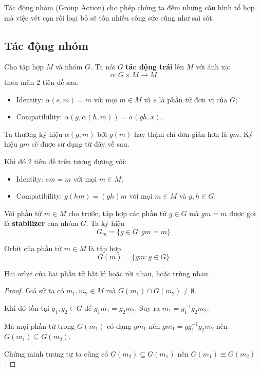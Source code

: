 Tác động nhóm (Group Action) cho phép chúng ta đếm những cấu hình tổ hợp mà việc vét cạn rồi loại bỏ sẽ tốn nhiều công sức cũng như sai sót.

\subsection*{Tác động nhóm}

Cho tập hợp $M$ và nhóm $G$. Ta nói $G$ \textbf{tác động trái} lên $M$ với ánh xạ:
\[\alpha: G \times M \rightarrow M\]
thỏa mãn 2 tiên đề sau:

\begin{itemize}
    \item Identity: $\alpha (e, m) = m$ với mọi $m \in M$ và $e$ là phần tử đơn vị của $G$;
    \item Compatibility: $\alpha (g, \alpha (h, m)) = \alpha (g h, x)$.
\end{itemize}

Ta thường ký hiệu $\alpha (g, m)$ bởi $g(m)$ hay thậm chí đơn giản hơn là $gm$. Ký hiệu $gm$ sẽ được sử dụng từ đây về sau.

Khi đó 2 tiên đề trên tương đương với:

\begin{itemize}
    \item Identity: $e m = m$ với mọi $m \in M$;
    \item Compatibility: $g(hm) = (gh)m$ với mọi $m \in M$ và $g, h \in G$.
\end{itemize}

\begin{definition}
    Với phần tử $m \in M$ cho trước, tập hợp các phần tử $g \in G$ mà $gm = m$ được gọi là \textbf{stabilizer} của nhóm $G$. Ta ký hiệu
    \[G_m = \{ g \in G : gm = m \}\]
\end{definition}

\begin{definition}
    Orbit của phần tử $m \in M$ là tập hợp
    \[G(m) = \{gm : g \in G\}\]
\end{definition}

\begin{remark}
    Hai orbit của hai phần tử bất kì hoặc rời nhau, hoặc trùng nhau.
\end{remark}

\begin{proof}
    Giả sử ta có $m_1, m_2 \in M$ mà $G(m_1) \cap G(m_2) \neq \emptyset$.

    Khi đó tồn tại $g_1, g_2 \in G$ để $g_1 m_1 = g_2 m_2$. Suy ra $m_1 = g_1^{-1} g_2 m_2$.

    Mà mọi phần tử trong $G(m_1)$ có dạng $g m_1$ nên $g m_1 = g g_1^{-1} g_2 m_2$ nên $G(m_1) \subseteq G(m_2)$.

    Chứng minh tương tự ta cũng có $G(m_2) \subseteq G(m_1)$ nên $G(m_1) \equiv G(m_2)$.
\end{proof}

